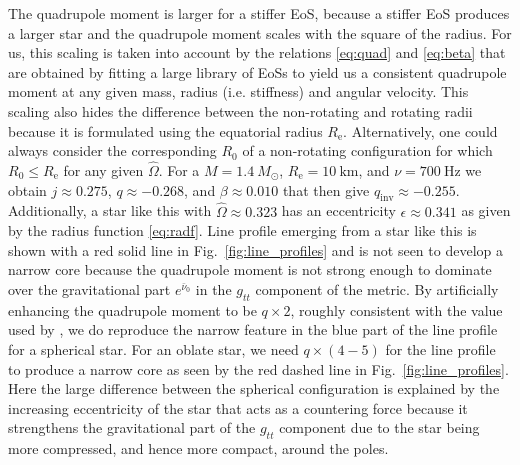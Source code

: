 \documentclass[iop, usenatbib]{emulateapj}
\newcommand{\Ob}{\ensuremath{\hat{\Omega}}}
\newcommand{\nub}{\ensuremath{\bar{\nu}}}
\newcommand{\Msun}{\ensuremath{M_{\odot}}}
\newcommand{\qinv}{\ensuremath{q_{\mathrm{inv}}}}
\begin{document}
The quadrupole moment is larger for a stiffer EoS, because a stiffer EoS produces a larger star and the quadrupole moment scales with the square of the radius.
For us, this scaling is taken into account by the relations \eqref{eq:quad} and \eqref{eq:beta} that are obtained by fitting a large library of EoSs \citep[see][]{aGM14} to yield us a consistent quadrupole moment at any given mass, radius (i.e. stiffness) and angular velocity.
This scaling also hides the difference between the non-rotating and rotating radii because it is formulated using the equatorial radius $R_{\mathrm{e}}$.
Alternatively, one could always consider the corresponding $R_0$ of a non-rotating configuration for which $R_0 \le R_{\mathrm{e}}$ for any given $\Ob$.
For a $M=1.4~\Msun$, $R_{\mathrm{e}}=10~\mathrm{km}$, and $\nu = 700~\mathrm{Hz}$ we obtain $j \approx 0.275$, $q \approx -0.268$, and $\beta \approx 0.010$ that then give $\qinv \approx -0.255$.
Additionally, a star like this with $\Ob \approx 0.323$ has an eccentricity $\epsilon \approx 0.341$ as given by the radius function \eqref{eq:radf}.
Line profile emerging from a star like this is shown with a red solid line in Fig.~\ref{fig:line_profiles} and is not seen to develop a narrow core because the quadrupole moment is not strong enough to dominate over the gravitational part $e^{\nub_0}$ in the $g_{tt}$ component of the metric.
By artificially enhancing the quadrupole moment to be $q \times 2$, roughly consistent with the value used by \citealt{BPO13}, we do reproduce the narrow feature in the blue part of the line profile for a spherical star.
For an oblate star, we need $q \times (4-5)$ for the line profile to produce a narrow core as seen by the red dashed line in Fig.~\ref{fig:line_profiles}.
Here the large difference between the spherical configuration is explained by the increasing eccentricity of the star that acts as a countering force because it strengthens the gravitational part of the $g_{tt}$ component due to the star being more compressed, and hence more compact, around the poles.
\end{document}
